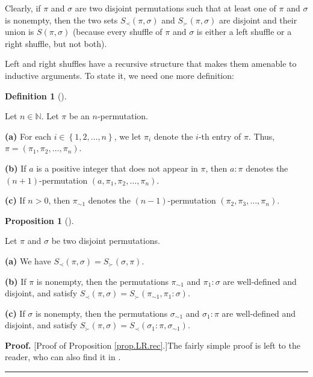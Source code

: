 \documentclass[numbers=enddot,12pt,final,onecolumn,notitlepage]{scrartcl}%
\theoremstyle{definition}
\newtheorem{prop}[theo]{Proposition}
\newenvironment{proposition}[1][]
{\begin{prop}[#1]\begin{leftbar}}
{\end{leftbar}\end{prop}}
\newtheorem{defi}[theo]{Definition}
\newenvironment{definition}[1][]
{\begin{defi}[#1]\begin{leftbar}}
{\end{leftbar}\end{defi}}
\newenvironment{proof}[1][Proof]{\noindent\textbf{#1.} }{\ \rule{0.5em}{0.5em}}
\newenvironment{vershort}{}{}
\begin{document}
Clearly, if $\pi$ and $\sigma$ are two disjoint permutations such that at
least one of $\pi$ and $\sigma$ is nonempty, then the two sets $S_{\prec
}\left(  \pi,\sigma\right)  $ and $S_{\succ}\left(  \pi,\sigma\right)  $ are
disjoint and their union is $S\left(  \pi,\sigma\right)  $ (because every
shuffle of $\pi$ and $\sigma$ is either a left shuffle or a right shuffle, but
not both).

Left and right shuffles have a recursive structure that makes them amenable to
inductive arguments. To state it, we need one more definition:

\begin{definition}
\label{def.LR.pi1}Let $n\in\mathbb{N}$. Let $\pi$ be an $n$-permutation.

\textbf{(a)} For each $i\in\left\{  1,2,\ldots,n\right\}  $, we let $\pi_{i}$
denote the $i$-th entry of $\pi$. Thus, $\pi=\left(  \pi_{1},\pi_{2}%
,\ldots,\pi_{n}\right)  $.

\textbf{(b)} If $a$ is a positive integer that does not appear in $\pi$, then
$a:\pi$ denotes the $\left(  n+1\right)  $-permutation $\left(  a,\pi_{1}%
,\pi_{2},\ldots,\pi_{n}\right)  $.

\textbf{(c)} If $n>0$, then $\pi_{\sim1}$ denotes the $\left(  n-1\right)
$-permutation $\left(  \pi_{2},\pi_{3},\ldots,\pi_{n}\right)  $.
\end{definition}

\begin{proposition}
\label{prop.LR.rec}Let $\pi$ and $\sigma$ be two disjoint permutations.

\textbf{(a)} We have $S_{\prec}\left(  \pi,\sigma\right)  =S_{\succ}\left(
\sigma,\pi\right)  $.

\textbf{(b)} If $\pi$ is nonempty, then the permutations $\pi_{\sim1}$ and
$\pi_{1}:\sigma$ are well-defined and disjoint, and satisfy $S_{\prec}\left(
\pi,\sigma\right)  =S_{\succ}\left(  \pi_{\sim1},\pi_{1}:\sigma\right)  $.

\textbf{(c)} If $\sigma$ is nonempty, then the permutations $\sigma_{\sim1}$
and $\sigma_{1}:\pi$ are well-defined and disjoint, and satisfy $S_{\succ
}\left(  \pi,\sigma\right)  =S_{\prec}\left(  \sigma_{1}:\pi,\sigma_{\sim
1}\right)  $.
\end{proposition}

\begin{vershort}
\begin{proof}
[Proof of Proposition \ref{prop.LR.rec}.]The fairly simple proof is left to
the reader, who can also find it in \cite{verlong}.
\end{proof}
\end{vershort}
\end{document}
